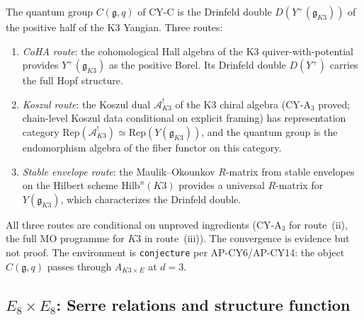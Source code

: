 \documentclass[11pt]{article}
\newcommand{\cA}{\mathcal{A}}
\newcommand{\fg}{\mathfrak{g}}
\newcommand{\Rep}{\mathrm{Rep}}
\begin{document}
\begin{conjecture}
\label{conj:cy-c-three-routes}
The quantum group $C(\fg, q)$ of CY-C is the Drinfeld double
$D(Y^+(\fg_{K3}))$ of the positive half of the K3 Yangian.
Three routes:
\begin{enumerate}[label=\textup{(\roman*)}]
 \item \emph{CoHA route}: the cohomological Hall algebra of the K3
 quiver-with-potential provides $Y^+(\fg_{K3})$ as the positive
 Borel. Its Drinfeld double $D(Y^+)$ carries the full Hopf structure.
 \item \emph{Koszul route}: the Koszul dual $\cA_{K3}^!$ of the K3
 chiral algebra (CY-A$_3$ proved; chain-level Koszul data conditional on explicit framing) has representation category
 $\Rep(\cA_{K3}^!) \simeq \Rep(Y(\fg_{K3}))$, and the quantum group
 is the endomorphism algebra of the fiber functor on this category.
 \item \emph{Stable envelope route}: the Maulik--Okounkov $R$-matrix
 from stable envelopes on the Hilbert scheme $\mathrm{Hilb}^n(K3)$
 provides a universal $R$-matrix for $Y(\fg_{K3})$, which
 characterizes the Drinfeld double.
\end{enumerate}
\end{conjecture}

\noindent All three routes are conditional on unproved ingredients
(CY-A$_3$ for route~(ii), the full MO programme for $K3$ in
route~(iii)). The convergence is evidence but not proof. The
environment is \texttt{conjecture} per AP-CY6/AP-CY14: the object
$C(\fg, q)$ passes through $A_{K3 \times E}$ at $d = 3$.


\subsection{$E_8 \times E_8$: Serre relations and structure function}
\label{subsec:e8-e8-structure}
\end{document}
